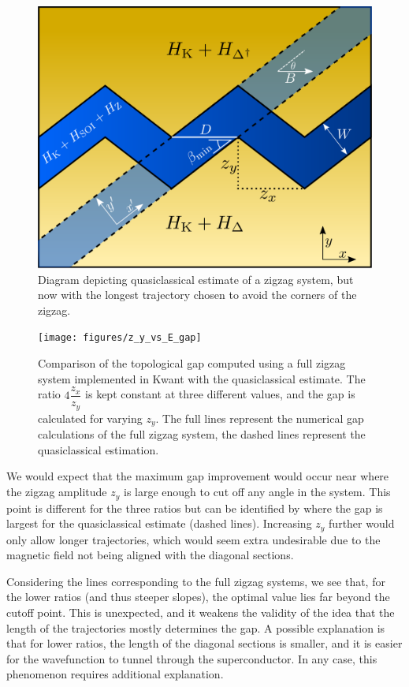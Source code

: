 			\begin{figure}
			\centering
			\includegraphics[width=0.45\columnwidth]{images/longest_trajectory_wo_corners}
			\caption{Diagram depicting quasiclassical estimate of a zigzag system, but now with the longest trajectory chosen to avoid the corners of the zigzag.}
			\label{fig:quasiclassical_approximation}
			\end{figure}

			\begin{figure}[!htb]
			\centering
			\texttt{[image: figures/z\_y\_vs\_E\_gap]}
			\caption{Comparison of the topological gap computed using a full zigzag system implemented in Kwant with the quasiclassical estimate.
			The ratio $4\dfrac{z_x}{z_y}$ is kept constant at three different values, and the gap is calculated for varying $z_y$.
			The full lines represent  the numerical gap calculations of the full zigzag system, the dashed lines represent the quasiclassical estimation.}
			\label{fig:quasiclassical_approximation}
			\end{figure}

			We would expect that the maximum gap improvement would occur near where the zigzag amplitude $z_y$ is large enough to cut off any angle in the system.
			This point is different for the three ratios but can be identified by where the gap is largest for the quasiclassical estimate (dashed lines).
			Increasing $z_y$ further would only allow longer trajectories, which would seem extra undesirable due to the magnetic field not being aligned with the diagonal sections.

			Considering the lines corresponding to the full zigzag systems, we see that, for the lower ratios (and thus steeper slopes), the optimal value lies far beyond the cutoff point.
			This is unexpected, and it weakens the validity of the idea that the length of the trajectories mostly determines the gap.
			A possible explanation is that for lower ratios, the length of the diagonal sections is smaller, and it is easier for the wavefunction to tunnel through the superconductor.
			In any case, this phenomenon requires additional explanation.

